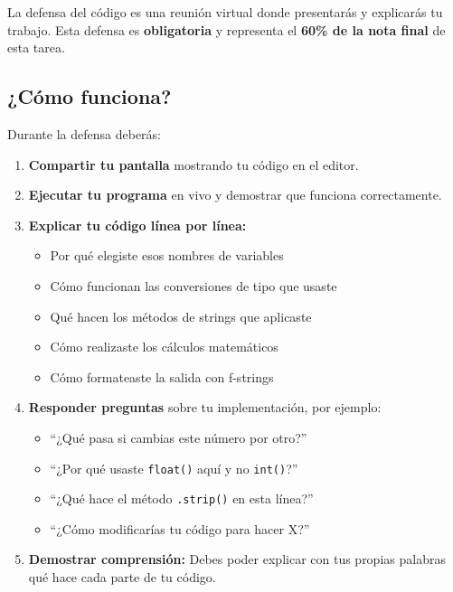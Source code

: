 \documentclass[12pt,a4paper]{article}
\begin{document}
La defensa del código es una reunión virtual donde presentarás y explicarás tu trabajo. Esta defensa es \textbf{obligatoria} y representa el \textbf{60\% de la nota final} de esta tarea.

\subsection{¿Cómo funciona?}

Durante la defensa deberás:

\begin{enumerate}[leftmargin=*]
    \item \textbf{Compartir tu pantalla} mostrando tu código en el editor.
    
    \item \textbf{Ejecutar tu programa} en vivo y demostrar que funciona correctamente.
    
    \item \textbf{Explicar tu código línea por línea:}
    \begin{itemize}
        \item Por qué elegiste esos nombres de variables
        \item Cómo funcionan las conversiones de tipo que usaste
        \item Qué hacen los métodos de strings que aplicaste
        \item Cómo realizaste los cálculos matemáticos
        \item Cómo formateaste la salida con f-strings
    \end{itemize}
    
    \item \textbf{Responder preguntas} sobre tu implementación, por ejemplo:
    \begin{itemize}
        \item ``¿Qué pasa si cambias este número por otro?''
        \item ``¿Por qué usaste \texttt{float()} aquí y no \texttt{int()}?''
        \item ``¿Qué hace el método \texttt{.strip()} en esta línea?''
        \item ``¿Cómo modificarías tu código para hacer X?''
    \end{itemize}
    
    \item \textbf{Demostrar comprensión:} Debes poder explicar con tus propias palabras qué hace cada parte de tu código.
\end{enumerate}
\end{document}
